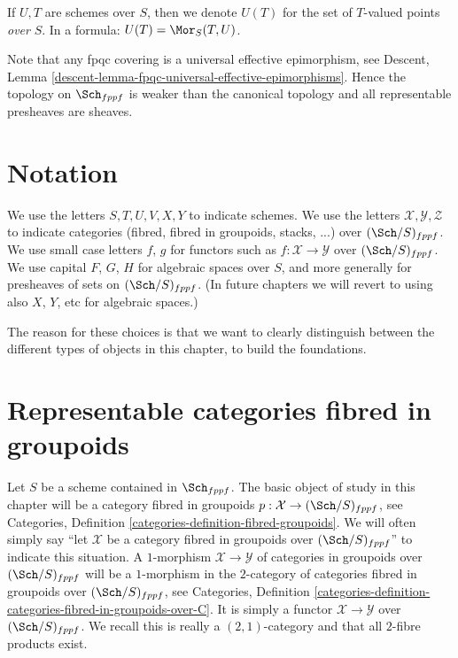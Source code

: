 \medskip\noindent
If $U, T$ are schemes over $S$, then we denote
$U(T)$ for the set of $T$-valued points {\it over} $S$.
In a formula: $U(T) = \Mor_S(T, U)$.

\medskip\noindent
Note that any fpqc covering is a universal effective
epimorphism, see
Descent, Lemma \ref{descent-lemma-fpqc-universal-effective-epimorphisms}.
Hence the topology on $\Sch_{fppf}$
is weaker than the canonical topology and all representable presheaves
are sheaves.








\section{Notation}
\label{section-notation}

\noindent
We use the letters $S, T, U, V, X, Y$ to indicate schemes.
We use the letters $\mathcal{X}, \mathcal{Y}, \mathcal{Z}$ to indicate
categories (fibred, fibred in groupoids, stacks, ...)
over $(\Sch/S)_{fppf}$. We use small case letters
$f$, $g$ for functors such as $f : \mathcal{X} \to \mathcal{Y}$
over $(\Sch/S)_{fppf}$.
We use capital $F$, $G$, $H$ for algebraic spaces over $S$, and more
generally for presheaves of sets on $(\Sch/S)_{fppf}$.
(In future chapters we will revert to using also $X$, $Y$, etc
for algebraic spaces.)

\medskip\noindent
The reason for these choices is that we want to clearly distinguish between
the different types of objects in this chapter, to build the foundations.









\section{Representable categories fibred in groupoids}
\label{section-representable}

\noindent
Let $S$ be a scheme contained in $\Sch_{fppf}$.
The basic object of study in this chapter will be a
category fibred in groupoids
$p : \mathcal{X} \to (\Sch/S)_{fppf}$, see
Categories, Definition \ref{categories-definition-fibred-groupoids}.
We will often simply say ``let $\mathcal{X}$ be a category fibred
in groupoids over $(\Sch/S)_{fppf}$'' to indicate
this situation. A $1$-morphism $\mathcal{X} \to \mathcal{Y}$ of categories
in groupoids over $(\Sch/S)_{fppf}$ will be a $1$-morphism
in the $2$-category of categories fibred in groupoids over
$(\Sch/S)_{fppf}$, see
Categories,
Definition \ref{categories-definition-categories-fibred-in-groupoids-over-C}.
It is simply a functor $\mathcal{X} \to \mathcal{Y}$ over
$(\Sch/S)_{fppf}$.
We recall this is really a $(2, 1)$-category and that all $2$-fibre products
exist.

